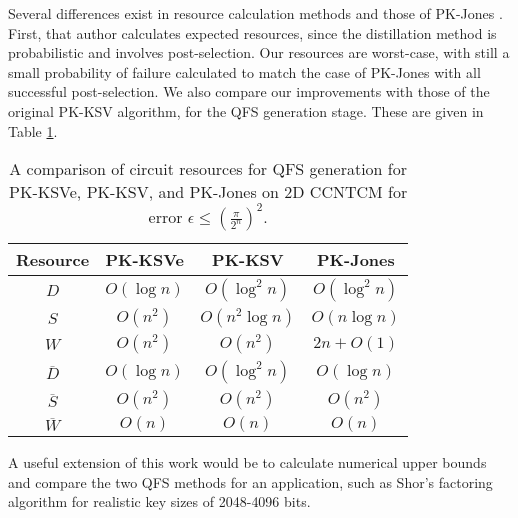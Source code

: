 Several differences exist in resource
calculation methods and those of PK-Jones \cite{Jones2012}. First, that
author calculates expected resources, since the distillation method is
probabilistic and involves post-selection. Our resources are worst-case,
with still a small probability of failure calculated to match the
case of PK-Jones with all successful post-selection. We also compare our
improvements with those of the original PK-KSV algorithm, for the QFS generation stage.
These are given in Table \ref{tab:ksv-resources}.

\begin{table}[hbt!]
\begin{tabular}{|c|c|c|c|}
\hline
Resource       & PK-KSVe     & PK-KSV         & PK-Jones\\
\hline
$D$            & $O(\log n)$ & $O(\log^2 n)$  & $O(\log^2 n)$ \\
$S$            & $O(n^2)$    & $O(n^2\log n)$ & $O(n \log n)$ \\
$W$            & $O(n^2)$    & $O(n^2)$       & $2n + O(1)$ \\
$\overline{D}$ & $O(\log n)$ & $O(\log^2 n)$  & $O(\log n)$ \\
$\overline{S}$ & $O(n^2)$    & $O(n^2)$       & $O(n^2)$ \\
$\overline{W}$ & $O(n)$      & $O(n)$         & $O(n)$ \\
\hline
\end{tabular}
\caption{A comparison of circuit resources for QFS generation for PK-KSVe, PK-KSV, and PK-Jones on \textsf{2D CCNTCM} for error $\epsilon \le \left( \frac{\pi}{2^n} \right)^2$.}
\label{tab:ksv-resources}
\end{table}

A useful extension of this work would be to calculate numerical upper bounds and compare the
two QFS methods for an application, such as Shor's factoring algorithm for realistic key sizes of
2048-4096 bits.